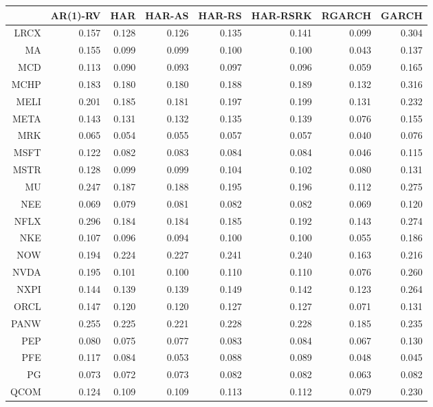 \begin{table}[ht]
\centering
\begin{tabular}{rrrrrrrr}
  \hline
 & AR(1)-RV & HAR & HAR-AS & HAR-RS & HAR-RSRK & RGARCH & GARCH \\ 
  \hline
LRCX & 0.157 & 0.128 & 0.126 & 0.135 & 0.141 & 0.099 & 0.304 \\ 
  MA & 0.155 & 0.099 & 0.099 & 0.100 & 0.100 & 0.043 & 0.137 \\ 
  MCD & 0.113 & 0.090 & 0.093 & 0.097 & 0.096 & 0.059 & 0.165 \\ 
  MCHP & 0.183 & 0.180 & 0.180 & 0.188 & 0.189 & 0.132 & 0.316 \\ 
  MELI & 0.201 & 0.185 & 0.181 & 0.197 & 0.199 & 0.131 & 0.232 \\ 
  META & 0.143 & 0.131 & 0.132 & 0.135 & 0.139 & 0.076 & 0.155 \\ 
  MRK & 0.065 & 0.054 & 0.055 & 0.057 & 0.057 & 0.040 & 0.076 \\ 
  MSFT & 0.122 & 0.082 & 0.083 & 0.084 & 0.084 & 0.046 & 0.115 \\ 
  MSTR & 0.128 & 0.099 & 0.099 & 0.104 & 0.102 & 0.080 & 0.131 \\ 
  MU & 0.247 & 0.187 & 0.188 & 0.195 & 0.196 & 0.112 & 0.275 \\ 
  NEE & 0.069 & 0.079 & 0.081 & 0.082 & 0.082 & 0.069 & 0.120 \\ 
  NFLX & 0.296 & 0.184 & 0.184 & 0.185 & 0.192 & 0.143 & 0.274 \\ 
  NKE & 0.107 & 0.096 & 0.094 & 0.100 & 0.100 & 0.055 & 0.186 \\ 
  NOW & 0.194 & 0.224 & 0.227 & 0.241 & 0.240 & 0.163 & 0.216 \\ 
  NVDA & 0.195 & 0.101 & 0.100 & 0.110 & 0.110 & 0.076 & 0.260 \\ 
  NXPI & 0.144 & 0.139 & 0.139 & 0.149 & 0.142 & 0.123 & 0.264 \\ 
  ORCL & 0.147 & 0.120 & 0.120 & 0.127 & 0.127 & 0.071 & 0.131 \\ 
  PANW & 0.255 & 0.225 & 0.221 & 0.228 & 0.228 & 0.185 & 0.235 \\ 
  PEP & 0.080 & 0.075 & 0.077 & 0.083 & 0.084 & 0.067 & 0.130 \\ 
  PFE & 0.117 & 0.084 & 0.053 & 0.088 & 0.089 & 0.048 & 0.045 \\ 
  PG & 0.073 & 0.072 & 0.073 & 0.082 & 0.082 & 0.063 & 0.082 \\ 
  QCOM & 0.124 & 0.109 & 0.109 & 0.113 & 0.112 & 0.079 & 0.230 \\ 

\end{tabular}
\end{table}

